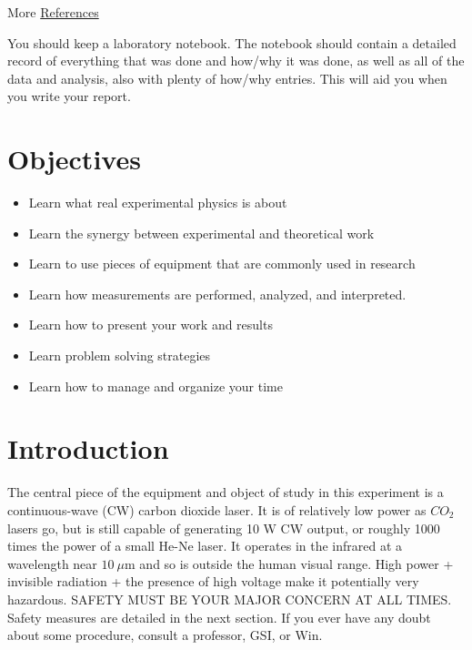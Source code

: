 \documentclass{../lab}
\begin{document}
More \hyperref[sec:References]{References}

You should keep a laboratory notebook. The notebook should contain a detailed record of everything that was done and how/why it was done, as well as all of the data and analysis, also with plenty of how/why entries. This will aid you when you write your report.

\section{Objectives}

\begin{itemize}
    \item Learn what real experimental physics is about

    \item Learn the synergy between experimental and theoretical work

    \item Learn to use pieces of equipment that are commonly used in research

    \item Learn how measurements are performed, analyzed, and interpreted.

    \item Learn how to present your work and results

    \item Learn problem solving strategies

    \item Learn how to manage and organize your time

\end{itemize}

\section{Introduction}

The central piece of the equipment and object of study in this experiment is a continuous-wave (CW) carbon dioxide laser. It is of relatively low power as $CO_2$ lasers go, but is still capable of generating 10 W CW output, or roughly 1000 times the power of a small He-Ne laser. It operates in the infrared at a wavelength near $10\ \mu$m and so is outside the human visual range. High power + invisible radiation + the presence of high voltage make it potentially very hazardous. SAFETY MUST BE YOUR MAJOR CONCERN AT ALL TIMES. Safety measures are detailed in the next section. If you ever have any doubt about some procedure, consult a professor, GSI, or Win.
\end{document}
